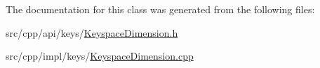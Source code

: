 The documentation for this class was generated from the following files:\begin{DoxyCompactItemize}
\item 
src/cpp/api/keys/\hyperlink{KeyspaceDimension_8h}{KeyspaceDimension.h}\item 
src/cpp/impl/keys/\hyperlink{KeyspaceDimension_8cpp}{KeyspaceDimension.cpp}\end{DoxyCompactItemize}
